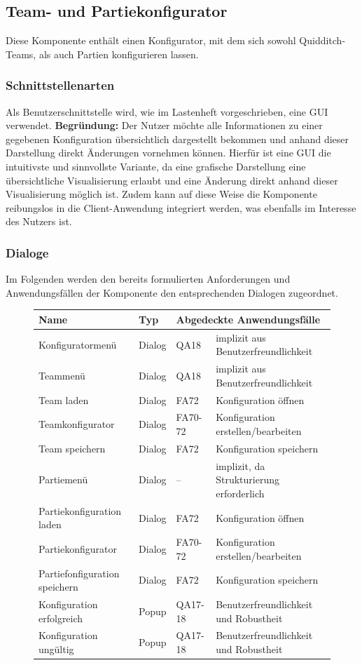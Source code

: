 \subsection{Team- und Partiekonfigurator}
Diese Komponente enthält einen Konfigurator, mit dem sich sowohl Quidditch-Teams, als auch Partien konfigurieren lassen.

\subsubsection{Schnittstellenarten}
Als Benutzerschnittstelle wird, wie im Lastenheft vorgeschrieben, eine GUI verwendet. \textbf{Begründung:} Der Nutzer möchte alle Informationen zu einer gegebenen Konfiguration übersichtlich dargestellt bekommen und anhand dieser Darstellung direkt Änderungen vornehmen können. Hierfür ist eine GUI die intuitivste und sinnvollste Variante, da eine grafische Darstellung eine übersichtliche Visualisierung erlaubt und eine Änderung direkt anhand dieser Visualisierung möglich ist. Zudem kann auf diese Weise die Komponente reibungslos in die Client-Anwendung integriert werden, was ebenfalls im Interesse des Nutzers ist.

\subsubsection{Dialoge}
Im Folgenden werden den bereits formulierten Anforderungen und Anwendungsfällen der Komponente den entsprechenden Dialogen zugeordnet.

\begin{figure}[H]
    \centering
    \begin{tabular}{| l l l l |}
    \hline
    \textbf{Name} & \textbf{Typ} & \multicolumn{2}{l|}{\textbf{Abgedeckte Anwendungsfälle}} \\\hline
    Konfiguratormenü & Dialog & QA18 & implizit aus Benutzerfreundlichkeit\\\hline
    Teammenü & Dialog & QA18 & implizit aus Benutzerfreundlichkeit\\\hline
    Team laden & Dialog & FA72 & Konfiguration öffnen \\\hline
    Teamkonfigurator & Dialog & FA70-72 & Konfiguration erstellen/bearbeiten\\\hline
    Team speichern & Dialog & FA72 & Konfiguration speichern \\\hline
    Partiemenü & Dialog & – & implizit, da Strukturierung erforderlich\\\hline
    Partiekonfiguration laden & Dialog & FA72 & Konfiguration öffnen \\\hline
    Partiekonfigurator & Dialog & FA70-72 & Konfiguration erstellen/bearbeiten\\\hline
    Partiefonfiguration speichern & Dialog & FA72 & Konfiguration speichern \\\hline
    Konfiguration erfolgreich & Popup & QA17-18 & Benutzerfreundlichkeit und Robustheit\\\hline
    Konfiguration ungültig & Popup & QA17-18 & Benutzerfreundlichkeit und Robustheit\\\hline
    \end{tabular}
\end{figure}

